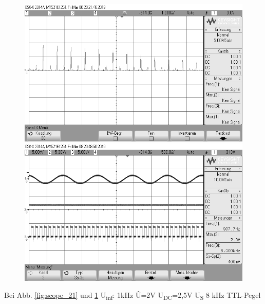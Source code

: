 \documentclass[12pt,a4paper]{scrartcl}
\begin{document}
     \begin{figure}[htbp]
    \begin{minipage}{0.48\textwidth}
     \centering
      \includegraphics[width=1\textwidth]{scope_21}
      \caption{}
      \label{fig:scope_21}
    \end{minipage}\hfill
    \begin{minipage}{0.48\textwidth}
     \centering
      \includegraphics[width=1\textwidth]{scope_22}
      \caption{}
      \label{fig:scope_22}
    \end{minipage}
  \end{figure} 
   Bei Abb. \ref{fig:scope_21} und \ref{fig:scope_22} U\textsubscript{inf}:  1kHz \^{U}=2V
        U\textsubscript{DC}=2,5V
        U\textsubscript{S} 8 kHz TTL-Pegel
        \newpage
\end{document}
